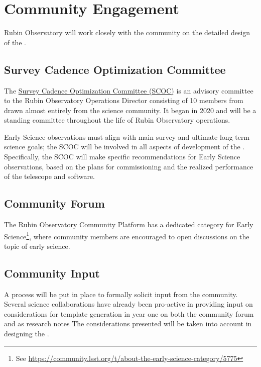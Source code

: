 \section{Community Engagement}

Rubin Observatory will work closely with the community on the detailed design of the \esp. 

\subsection{Survey Cadence Optimization Committee}
The \href{https://www.lsst.org/content/charge-survey-cadence-optimization-committee-scoc}{Survey Cadence Optimization Committee (SCOC)} is an advisory committee to the Rubin Observatory Operations Director consisting of 10 members from drawn almost entirely from the science community.
It began in 2020 and will be a standing committee throughout the life of Rubin Observatory operations. 

Early Science observations must align with main survey and ultimate long-term science goals; the SCOC will be involved in all aspects of development of the \esp. 
Specifically, the SCOC will make specific recommendations for Early Science observations, based on the plans for commissioning and the realized performance of the telescope and software. 


\subsection{Community Forum}

The Rubin Observatory Community Platform has a dedicated category for Early Science\footnote{ See \url{https://community.lsst.org/t/about-the-early-science-category/5775}}, where community members are encouraged to open discussions on the topic of early science. 

\subsection{Community Input}

A process will be put in place to formally solicit input from the community. 
Several science collaborations have already been pro-active in providing input on considerations for template generation in year one on both the community forum and as research notes
The considerations presented will be taken into account in designing the \esp. 